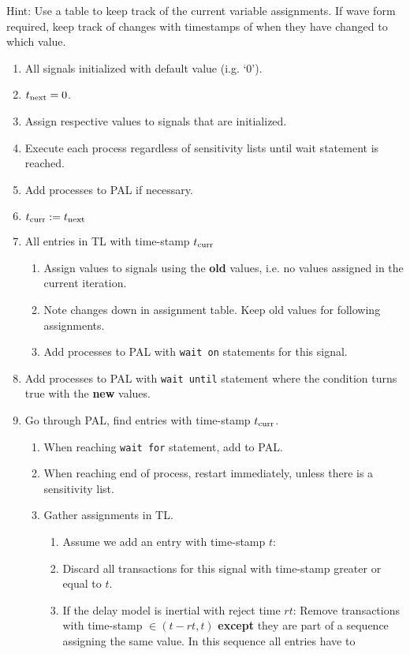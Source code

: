 Hint: Use a table to keep track of the current variable assignments. If wave form required, keep track of changes with timestamps of when
they have changed to which value.
\begin{enumerate}
	\item All signals initialized with default value (i.g. `0').
	\item $t_{\text{next}} = 0$. 
	\item Assign respective values to signals that are initialized.
	\item Execute each process regardless of sensitivity lists until wait statement
	is reached.
	\item Add processes to PAL if necessary.
	\item \label{item:iterationstep} $t_{\text{curr}} := t_{\text{next}}$
	\item \label{item:checktransactionlist} All entries in TL with time-stamp
	$t_{\text{curr}}$
	\begin{enumerate}
		\item Assign values to signals using the \textbf{old} values, i.e. no values
		assigned in the current iteration.
		\item Note changes down in assignment table. Keep old values for following
		assignments.
		\item Add processes to PAL with \texttt{wait on} statements for this signal.
	\end{enumerate}
	\item Add processes to PAL with \texttt{wait until} statement where the
	condition turns true with the \textbf{new} values.
	\item Go through PAL, find entries with time-stamp $t_{\text{curr}}$.
	\begin{enumerate}
		\item When reaching \texttt{wait for} statement, add to PAL.
		\item When reaching end of process, restart immediately, unless there is a
		sensitivity list.
		\item Gather assignments in TL.
		\begin{enumerate}
			\item Assume we add an entry with time-stamp $t$:
			\item Discard all transactions for this signal with time-stamp greater or
			equal to $t$.
			\item If the delay model is inertial with reject time $rt$: Remove
			transactions with time-stamp $\in (t-rt, t)$ \textbf{except} they are part of
			a sequence assigning the same value. In this sequence all entries have to

\end{enumerate}
\end{enumerate}
\end{enumerate}

